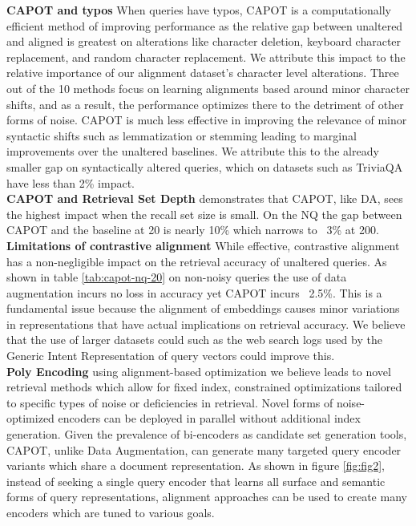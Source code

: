 \textbf{CAPOT and typos} When queries have typos, CAPOT is a computationally efficient method of improving performance as the relative gap between unaltered and aligned is greatest on alterations like character deletion, keyboard character replacement, and random character replacement. We attribute this impact to the relative importance of our alignment dataset's character level alterations. Three out of the 10 methods focus on learning alignments based around minor character shifts, and as a result, the performance optimizes there to the detriment of other forms of noise. CAPOT is much less effective in improving the relevance of minor syntactic shifts such as lemmatization or stemming leading to marginal improvements over the unaltered baselines. We attribute this to the already smaller gap on syntactically altered queries, which on datasets such as TriviaQA have less than 2\% impact.\\
\textbf{CAPOT and Retrieval Set Depth} demonstrates that CAPOT, like DA, sees the highest impact when the recall set size is small. On the NQ the gap between CAPOT and the baseline at 20 is nearly 10\% which narrows to ~3\% at 200.  \\
\textbf{Limitations of contrastive alignment} While effective, contrastive alignment has a non-negligible impact on the retrieval accuracy of unaltered queries. As shown in table \ref{tab:capot-nq-20} on non-noisy queries the use of data augmentation incurs no loss in accuracy yet CAPOT incurs ~2.5\%. This is a fundamental issue because the alignment of embeddings causes minor variations in representations that have actual implications on retrieval accuracy. We believe that the use of larger datasets could such as the web search logs used by the Generic Intent Representation of query vectors \cite{Zhang2019GenericIR} could improve this.\\
\textbf{Poly Encoding} using alignment-based optimization we believe leads to novel retrieval methods which allow for fixed index, constrained optimizations tailored to specific types of noise or deficiencies in retrieval. Novel forms of noise-optimized encoders can be deployed in parallel without additional index generation. Given the prevalence of bi-encoders as candidate set generation tools, CAPOT, unlike Data Augmentation, can generate many targeted query encoder variants which share a document representation. As shown in figure \ref{fig:fig2}, instead of seeking a single query encoder that learns all surface and semantic forms of query representations, alignment approaches can be used to create many encoders which are tuned to various goals. 
